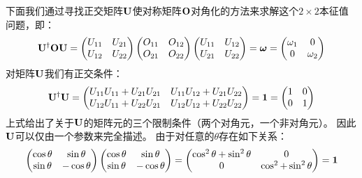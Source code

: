 下面我们通过寻找正交矩阵$\mathbf U$使对称矩阵$\mathbf O$对角化的方法来求解这个$2\times2$本征值问题，即：
\begin{equation}
 \mathbf U^\dagger\mathbf{O}\mathbf{U} = \begin{pmatrix}
     U_{11} & U_{21} \\ U_{12} & U_{22}
 \end{pmatrix} \begin{pmatrix}
     O_{11} & O_{12} \\ O_{21} & O_{22}
 \end{pmatrix} \begin{pmatrix}
     U_{11} & U_{12} \\ U_{21} & U_{22}
 \end{pmatrix} = \boldsymbol\omega = \begin{pmatrix}
     \omega_1 & 0 \\
     0 &\omega_2
 \end{pmatrix}
 \label{eq:1.101}
\end{equation}
对矩阵$\mathbf U$我们有正交条件：
\begin{equation}
 \mathbf U^\dagger\mathbf{U} = \begin{pmatrix}
     U_{11}U_{11} + U_{21}U_{21} & U_{11}U_{12} + U_{21}U_{22} \\
     U_{12}U_{11} + U_{22}U_{21} & U_{12}U_{12} + U_{22}U_{22}
 \end{pmatrix} = \mathbf{1} = \begin{pmatrix}
     1 & 0 \\ 0 &1
 \end{pmatrix}
 \label{eq:1.102}
\end{equation}
上式给出了关于$\mathbf U$的矩阵元的三个限制条件（两个对角元，一个非对角元）。
因此$\mathbf U$可以仅由一个参数来完全描述。
由于对任意的$\theta$存在如下关系：
\begin{equation}
 \begin{pmatrix}
     \cos{\theta} &\sin{\theta} \\ \sin{\theta} & -\cos{\theta}
 \end{pmatrix} \begin{pmatrix}
     \cos{\theta} & \sin{\theta} \\ \sin{\theta} &-\cos{\theta}
 \end{pmatrix} = \begin{pmatrix}
     \cos^2{\theta} + \sin^2{\theta} & 0 \\ 0 & \cos^2 + \sin^2{\theta}
 \end{pmatrix} = \mathbf{1}
 \label{eq:1.103}
\end{equation}
